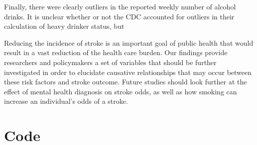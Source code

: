 \documentclass[11pt,]{article}
\begin{document}
Finally, there were clearly outliers in the reported weekly number of
alcohol drinks. It is unclear whether or not the CDC accounted for
outliers in their calculation of heavy drinker status, but

Reducing the incidence of stroke is an important goal of public health
that would result in a vast reduction of the health care burden. Our
findings provide researchers and policymakers a set of variables that
should be further investigated in order to elucidate causative
relationships that may occur between these risk factors and stroke
outcome. Future studies should look further at the effect of mental
health diagnosis on stroke odds, as well as how smoking can increase an
individual's odds of a stroke.




\newpage
\singlespacing 


\appendix
\section{Code}
%
%
%
\end{document}
